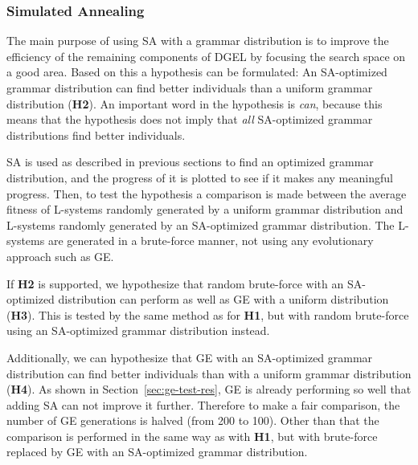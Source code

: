 \subsubsection{Simulated Annealing}
The main purpose of using \gls{SA} with a grammar distribution is to improve the efficiency of the remaining components of \gls{DGEL} by focusing the search space on a good area.
Based on this a hypothesis can be formulated: An \gls{SA}-optimized grammar distribution can find better individuals than a uniform grammar distribution (\textbf{H2}).
An important word in the hypothesis is \textit{can}, because this means that the hypothesis does not imply that \textit{all} \gls{SA}-optimized grammar distributions find better individuals.

\gls{SA} is used as described in previous sections to find an optimized grammar distribution, and the progress of it is plotted to see if it makes any meaningful progress.
Then, to test the hypothesis a comparison is made between the average fitness of \glspl{L-system} randomly generated by a uniform grammar distribution and \glspl{L-system} randomly generated by an \gls{SA}-optimized grammar distribution.
The \glspl{L-system} are generated in a brute-force manner, not using any evolutionary approach such as \gls{GE}.

If \textbf{H2} is supported, we hypothesize that random brute-force with an \gls{SA}-optimized distribution can perform as well as \gls{GE} with a uniform distribution (\textbf{H3}).
This is tested by the same method as for \textbf{H1}, but with random brute-force using an \gls{SA}-optimized grammar distribution instead.

Additionally, we can hypothesize that \gls{GE} with an \gls{SA}-optimized grammar distribution can find better individuals than with a uniform grammar distribution (\textbf{H4}).
As shown in Section~\ref{sec:ge-test-res}, GE is already performing so well that adding SA can not improve it further.
Therefore to make a fair comparison, the number of GE generations is halved (from 200 to 100).
Other than that the comparison is performed in the same way as with \textbf{H1}, but with brute-force replaced by \gls{GE} with an \gls{SA}-optimized grammar distribution.

